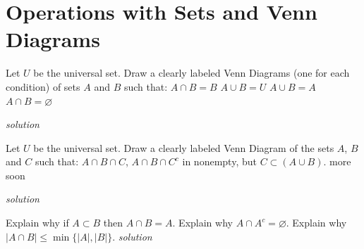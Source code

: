 \documentclass{amsbook}
\begin{document}
\begin{Answer}[ref={s6}]
    
\end{Answer}


\section{Operations with Sets and Venn Diagrams}

\begin{Exercise}[title={Visualizing Some Sets}, difficulty=0, label=vd1]
    Let $U$ be the universal set. Draw a clearly labeled Venn Diagrams (one for each condition) of sets $A$ and $B$ such that:    
    \Question $A \cap B = B$
    \Question $A \cup B =U$
    \Question $A \cup B= A$
    \Question $A \cap B =\varnothing$

    \hfill \emph{solution} 
\end{Exercise}

\begin{Answer}[ref={vd1}]
    
\end{Answer}

\begin{Exercise}[title={Visualizing Some Sets II}, difficulty=0, label=vd2]
    Let $U$ be the universal set. Draw a clearly labeled Venn Diagram of the sets $A$, $B$ and $C$ such that:
    \Question $A \cap B \cap C$, $A \cap B \cap C^c$ in nonempty, but $C \subset (A \cup B)$.
    \Question more soon

    \hfill \emph{solution}     
\end{Exercise}

\begin{Answer}[ref={vd2}]
    
\end{Answer}

\begin{Exercise}[title={Intersections II}, difficulty=1, label=os1]
    \Question Explain why if $A \subset B$ then $A \cap B=A$.
    \Question Explain why $A \cap A^c = \varnothing$.
    \Question Explain why $|A \cap B| \leq \min\{|A|, |B|\}$.
\hfill \emph{solution} 
\end{Exercise}

\begin{Answer}[ref={os1}]
    
\end{Answer}
\end{document}
